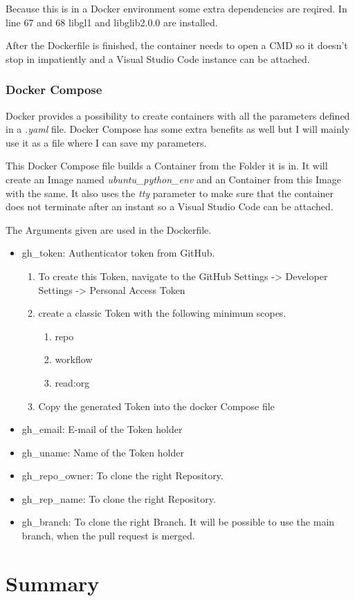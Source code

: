 \documentclass[a4paper, 12pt, oneside]{scrbook}
\begin{document}
		\noindent Because this is in a Docker environment some extra dependencies are reqired. In line 67 and 68 libgl1 and libglib2.0.0 are installed. 
		
		\noindent 
		
		\noindent After the Dockerfile is finished, the container needs to open a CMD so it doesn't stop in impatiently and a Visual Studio Code instance can be attached.
		
		\noindent 
		
		\subsection{Docker Compose}
		
		
		Docker provides a possibility to create containers with all the parameters defined in a \textit{.yaml} file. Docker Compose has some extra benefits as well but I will mainly use it as a file where I can save my parameters. 
		
		\noindent This Docker Compose file builds a Container from the Folder it is in. It will create an Image named \textit{ubuntu\_python\_env} and an Container from this Image with the same. It also uses the \textit{tty} parameter to make sure that the container does not terminate after an instant so a Visual Studio Code can be attached. 
		
		\noindent The Arguments given are used in the Dockerfile. 
		
		\begin{itemize}
			\item gh\_token:  Authenticator token from GitHub. 
			\begin{enumerate}
				\item To create this Token, navigate to the GitHub Settings -> Developer Settings -> Personal Access Token
				\item create a classic Token with the following minimum scopes.
				\begin{enumerate}
					\item repo
					\item workflow
					\item read:org
				\end{enumerate}
				\item Copy the generated Token into the docker Compose file
			\end{enumerate}
			\item gh\_email:  E-mail of the Token holder
			\item gh\_uname:  Name of the Token holder
			\item gh\_repo\_owner:  To clone the right Repository.
			\item gh\_rep\_name:  To clone the right Repository.
			\item gh\_branch:  To clone the right Branch. It will be possible to use the main branch, when the pull request is merged.
		\end{itemize}
		
		\noindent 
		
	\chapter{Summary} %
	
	\frontmatter
	\printbibliography
\end{document}
